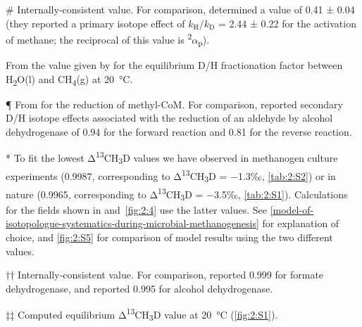 \begin{table}
\begin{threeparttable}
\begin{tablenotes}
			\item \# Internally-consistent value. For comparison, \textcite{Scheller++_2013_JACS_KIE} 
			determined a value of 0.41 ± 0.04 (they reported a primary isotope effect of $k_\mathrm{H}/k_\mathrm{D}$ = 2.44 ± 0.22 for the activation of methane; the reciprocal of this value is \textsuperscript{2}$\alpha$\textsubscript{p}).
			
			\item \textbar{}\textbar{} From the value given by
			\textcite{Horibe+Craig_1995_GCA} for the equilibrium D/H fractionation factor between
			H\textsubscript{2}O(l) and CH\textsubscript{4}(g) at 20~°C.
			
			\item ¶ From \textcite{Scheller++_2013_JACS_KIE} for the reduction of methyl-CoM.  For comparison, \textcite{Roston+Kohen_2010_PNAS} 
			reported secondary D/H isotope effects associated with the reduction of an aldehyde by alcohol dehydrogenase of 0.94 for the forward reaction and 0.81 for the reverse reaction. 
			
			\item ** To fit the lowest Δ\textsuperscript{13}CH\textsubscript{3}D values we
			have observed in methanogen culture experiments (0.9987, corresponding
			to Δ\textsuperscript{13}CH\textsubscript{3}D = $-$1.3‰, \autoref{tab:2:S2}) or in
			nature (0.9965, corresponding to
			Δ\textsuperscript{13}CH\textsubscript{3}D = $-$3.5‰, \autoref{tab:2:S1}).
			Calculations for the fields shown in  and~\ref{fig:2:4} use the latter
			values. See \autoref{model-of-isotopologue-systematics-during-microbial-methanogenesis} for explanation of choice, and
			\autoref{fig:2:S5} for comparison of model results using the two different values.
			
			\item †† Internally-consistent value. For comparison, \textcite{Hermes++_1984_Bc}
			reported 0.999 for formate dehydrogenase, and \textcite{Scharschmidt++_1984_Bc} reported 0.995 for alcohol dehydrogenase.
			
			\item ‡‡ Computed equilibrium Δ\textsuperscript{13}CH\textsubscript{3}D value
			at 20~°C (\autoref{fig:2:S1}).
		\end{tablenotes}

	\end{threeparttable}
\end{table}